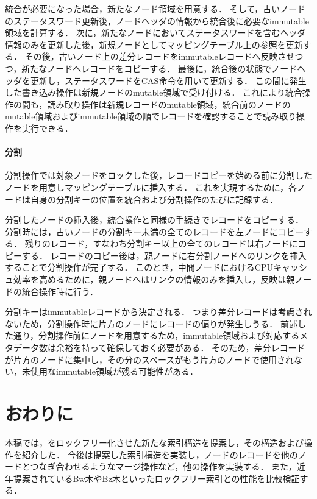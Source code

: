統合が必要になった場合，新たなノード領域を用意する．
そして，古いノードのステータスワード更新後，ノードヘッダの情報から統合後に必要なimmutable領域を計算する．
次に，新たなノードにおいてステータスワードを含むヘッダ情報のみを更新した後，新規ノードとしてマッピングテーブル上の参照を更新する．
その後，古いノード上の差分レコードをimmutableレコードへ反映させつつ，新たなノードへレコードをコピーする．
最後に，統合後の状態でノードヘッダを更新し，ステータスワードをCAS命令を用いて更新する．
この間に発生した書き込み操作は新規ノードのmutable領域で受け付ける．
これにより統合操作の間も，読み取り操作は新規レコードのmutable領域，統合前のノードのmutable領域およびimmutable領域の順でレコードを確認することで読み取り操作を実行できる．

\paragraph{分割}

分割操作では対象ノードをロックした後，レコードコピーを始める前に分割したノードを用意しマッピングテーブルに挿入する．
これを実現するために，各ノードは自身の分割キーの位置を統合および分割操作のたびに記録する．

分割したノードの挿入後，統合操作と同様の手続きでレコードをコピーする．
分割時には，古いノードの分割キー未満の全てのレコードを左ノードにコピーする．
残りのレコード，すなわち分割キー以上の全てのレコードは右ノードにコピーする．
レコードのコピー後は，親ノードに右分割ノードへのリンクを挿入することで分割操作が完了する．
このとき，中間ノードにおけるCPUキャッシュ効率を高めるために，親ノードへはリンクの情報のみを挿入し，反映は親ノードの統合操作時に行う．

分割キーはimmutableレコードから決定される．
つまり差分レコードは考慮されないため，分割操作時に片方のノードにレコードの偏りが発生しうる．
前述した通り，分割操作前にノードを用意するため，immutable領域および対応するメタデータ数は余裕を持って確保しておく必要がある．
そのため，差分レコードが片方のノードに集中し，その分のスペースがもう片方のノードで使用されない，未使用なimmutable領域が残る可能性がある．

\section{おわりに}
\label{sec:conclusion}

本稿では，\Bptree{}をロックフリー化させた新たな索引構造\Bctree{}を提案し，その構造および操作を紹介した．
今後は提案した索引構造を実装し，ノードのレコードを他のノードとつなぎ合わせるようなマージ操作など，他の操作を実装する．
また，近年提案されているBw木やBz木といったロックフリー索引との性能を比較検証する．